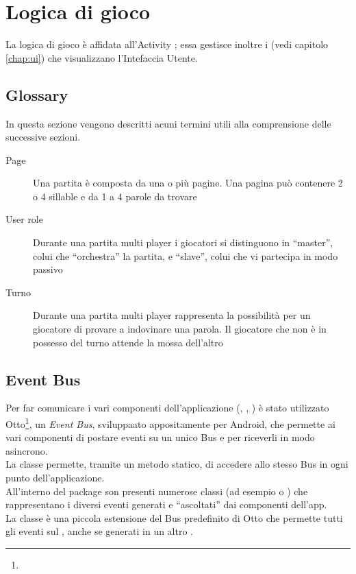 


\chapter{Logica di gioco}

La logica di gioco è affidata all'Activity ; essa gestisce inoltre i  (vedi capitolo \ref{chap:ui}) che visualizzano l'Intefaccia Utente.

\section{Glossary}
\label{sec:glossary}
In questa sezione vengono descritti acuni termini utili alla comprensione delle successive sezioni.

\begin{description}
\item[Page] Una partita è composta da una o più pagine. Una pagina può contenere 2 o 4 sillable e da 1 a 4 parole da trovare
\item[User role] Durante una partita multi player i giocatori si distinguono in ``master'', colui che ``orchestra'' la partita, e ``slave'', colui che vi partecipa in modo passivo 
\item[Turno] Durante una partita multi player rappresenta la possibilità per un giocatore di provare a indovinare una parola. Il giocatore che non è in possesso del turno attende la mossa dell'altro
\end{description}

\section{Event Bus}
\label{sec:event_bus}
Per far comunicare i vari componenti dell'applicazione (, , ) è stato utilizzato Otto\footnote{}, un \textit{Event Bus}, sviluppaato appositamente per Android, che permette ai vari componenti di postare eventi su un unico Bus e per riceverli in modo asincrono.\\
La classe  permette, tramite un metodo statico, di accedere allo stesso Bus in ogni punto dell'applicazione.\\
All'interno del package  son presenti numerose classi (ad esempio  o ) che rappresentano i diversi eventi generati e ``ascoltati'' dai componenti dell'app.\\
La classe  è una piccola estensione del Bus predefinito di Otto che permette tutti gli eventi sul , anche se generati in un altro .

